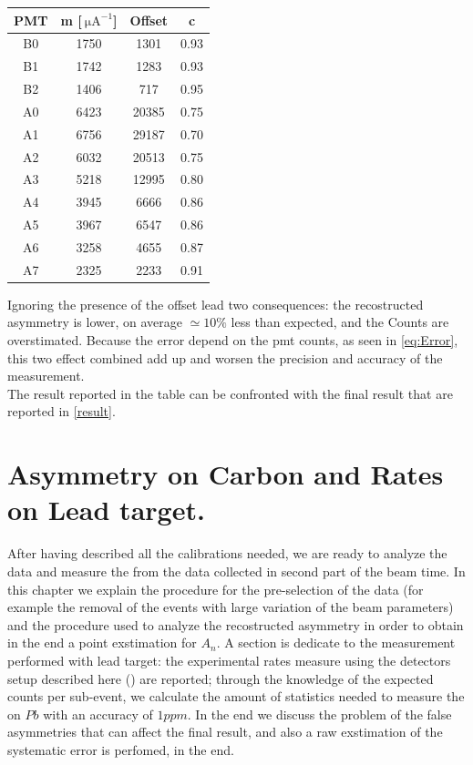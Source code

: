 \begin{table}[ht]
\centering
\begin{tabular}{c|c|c|c}
\hline
 PMT & m [$\SI{}{\micro \ampere}^{-1}$] & Offset & c  \\
\hline
 B0  & 1750 &  1301 &  0.93 \\
 B1  & 1742 &  1283 &  0.93 \\
 B2  & 1406 &   717 &  0.95 \\
 A0  & 6423 & 20385 &  0.75 \\
 A1  & 6756 & 29187 &  0.70 \\
 A2  & 6032 & 20513 &  0.75 \\
 A3  & 5218 & 12995 &  0.80 \\
 A4  & 3945 &  6666 &  0.86 \\
 A5  & 3967 &  6547 &  0.86 \\
 A6  & 3258 &  4655 &  0.87 \\
 A7  & 2325 &  2233 &  0.91 \\
\hline
\end{tabular}
\end{table}
Ignoring the presence of the offset lead two consequences: the recostructed asymmetry is lower, on average $ \simeq 10\%$ less than expected, and the Counts are overstimated. Because the error depend on the pmt counts, as seen in \ref{eq:Error}, this two effect combined add up and worsen the precision and accuracy of the measurement.\\
The result reported in the table can be confronted with the final result that are reported in \ref{result}. 

\newpage



\chapter{Asymmetry on Carbon and Rates on Lead target.}

After having described all the calibrations needed, we are ready to analyze the data and measure the \transv from the data collected in second part of the beam time. In this chapter we explain the procedure for the pre-selection of the data (for example the removal of the events with large variation of the beam parameters) and the procedure used to analyze the recostructed asymmetry in order to obtain in the end a point exstimation for $A_{n}$. A section is dedicate to the measurement performed with lead target: the experimental rates measure using the detectors setup described here () are reported; through the knowledge of the expected counts per sub-event, we calculate the amount of statistics needed to measure the \transv on $Pb$ with an accuracy of $1 ppm$. In the end we discuss the problem of the false asymmetries that can affect the final result, and also a raw exstimation of the systematic error is perfomed, in the end. 

